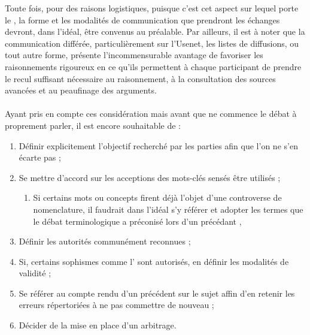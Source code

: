 Toute fois, pour des raisons logistiques, puisque c’est cet aspect sur lequel porte le \mainabbr{}, la forme et les modalités de communication que prendront les échanges devront, dans l’idéal, être convenus au préalable. Par ailleurs, il est à noter que la communication différée, particulièrement sur l’Usenet, les listes de diffusions, ou tout autre forme, présente l’incommensurable avantage de favoriser les raisonnements rigoureux en ce qu’ils permettent à chaque participant de prendre le recul suffisant nécessaire au raisonnement, à la consultation des sources avancées et au peaufinage des arguments.

\paragraph{}
Ayant pris en compte ces considération mais avant que ne commence le débat à proprement parler, il est encore souhaitable de :

\begin{enumerate}
  \item Définir explicitement l’objectif recherché par les parties afin que l’on ne s’en écarte pas ;

  \item Se mettre d’accord sur les acceptions des mots-clés sensés être utilisés ;

  \begin{enumerate}
    \item Si certains mots ou concepts firent déjà l’objet d’une controverse de nomenclature, il faudrait dans l’idéal s’y référer et adopter les termes que le débat terminologique a préconisé lors d’un précédant \mainabbr{},
  \end{enumerate}

  \item Définir les autorités communément reconnues ;

  \item Si, certains sophismes comme l’ sont autorisés, en définir les modalités de validité ;

  \item Se référer au compte rendu d’un précédent \mainabbr{} sur le sujet affin d’en retenir les erreurs répertoriées à ne pas commettre de nouveau ;

  \item Décider de la mise en place d’un arbitrage.

\end{enumerate}

